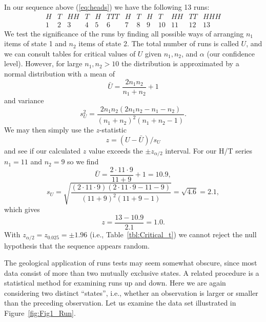 \begin{example}
In our sequence above (\ref{eq:heads}) we have the following 13 runs:
\begin{equation}
\begin{array}{rrcrrcrrrcccc}
                 H & T & HH &  T &  H &  TTT & H & T &  H &   T &   HH &   TT &   HHH\\
                  1 & 2 &  3 &     4 &   5 &     6 &    7 &   8 &   9 &    10 &  11 &    12 &     13\end{array} 
\end{equation}
We test the significance of the runs by finding all possible ways of arranging $n_1$ items of state 1 
and $n_2$ items of state 2.  The total number of runs is called $U$, and we can consult tables for critical 
values of $U$ given $n_1, n_2$, and $\alpha$ (our confidence level).  However, for large $n_1, n_2 > 10$  the 
distribution is approximated by a normal distribution with a mean of 
\begin{equation}
\bar{U} = \frac{2n_1 n_2}{n_1 + n_2} + 1
\end{equation}
and variance
\begin{equation}
s^2_U = \frac{2n_1 n_2 (2n_1 n_2- n_1 - n_2)}{(n_1 + n_2)^2 (n_1 + n_2 -1)}.
\end{equation}
We may then simply use the $z$-statistic
\begin{equation}
z = (U - \bar{U})/ s_U
\end{equation}
and see if our calculated $z$ value exceeds the $\pm z_{\alpha/2}$ interval.  For our H/T series
$n_1 = 11$ and $n_2 = 9$ so we find
\begin{equation}
\bar{U} = \frac{2 \cdot 11 \cdot 9}{11 + 9} + 1 = 10.9,
\end{equation}
\begin{equation}
s_U = \sqrt{\frac{(2 \cdot 11 \cdot 9)(2 \cdot 11 \cdot 9 - 11 - 9)}{(11 + 9)^2(11+9 -1)}} = \sqrt{4.6} = 2.1,
\end{equation}
which gives
\begin{equation}
z = \frac{13 - 10.9}{2.1} = 1.0.
\end{equation}
With $z_{\alpha/2} = z_{0.025} = \pm 1.96$ (i.e., Table~\ref{tbl:Critical_t}) we cannot reject the null hypothesis that the sequence appears random.
\end{example}

	The geological application of runs tests may seem somewhat obscure, since most data 
consist of more than two mutually exclusive states.  A related procedure is a statistical method 
for examining runs up and down.  Here we are again considering two distinct ``states'', i.e., 
whether an observation is larger or smaller than the preceding observation.  Let us examine the 
data set illustrated in Figure~\ref{fig:Fig1_Run}.

